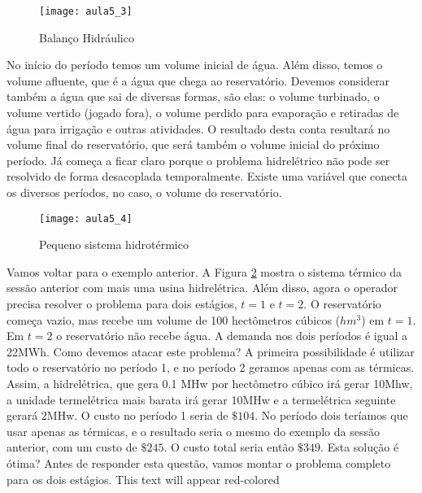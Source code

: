 \begin{figure}[H]
\begin{centering}
\texttt{[image: aula5\_3]}\protect\caption{\label{fig:balhid} Balanço Hidráulico}
\end{centering}
\end{figure}

No início do período temos um volume inicial de água. Além disso, temos o volume afluente, que é a água que chega ao reservatório. Devemos considerar também a água que sai de diversas formas, são elas: o volume turbinado, o volume vertido (jogado fora), o volume perdido para evaporação e retiradas de água para irrigação e outras atividades. O resultado desta conta resultará no volume final do reservatório, que será também o volume inicial do próximo período. Já começa a ficar claro porque o problema hidrelétrico não pode ser resolvido de forma desacoplada temporalmente. Existe uma variável que conecta os diversos períodos, no caso, o volume do reservatório. 

\begin{figure}[H]
\begin{centering}
\texttt{[image: aula5\_4]}\protect\caption{\label{fig:hdrotermico1}Pequeno sistema hidrotérmico}
\end{centering}
\end{figure}

Vamos voltar para o exemplo anterior. A Figura \ref{fig:hdrotermico1} mostra o sistema térmico da sessão anterior com mais uma usina hidrelétrica. Além disso, agora o operador precisa resolver o problema para dois estágios, $t=1$ e $t=2$. O reservatório começa vazio, mas recebe um volume de 100 hectômetros cúbicos ($hm^3$) em $t=1$. Em $t=2$ o reservatório não recebe água. A demanda nos dois períodos é igual a 22MWh. Como devemos atacar este problema? A primeira possibilidade é utilizar todo o reservatório no período 1, e no período 2 geramos apenas com as térmicas. Assim, a hidrelétrica, que gera 0.1 MHw por hectômetro cúbico irá gerar 10Mhw, a unidade termelétrica mais barata irá gerar 10MHw e a termelétrica seguinte gerará 2MHw. O custo no período 1 seria de $\$104$. No período dois teríamos que usar apenas as térmicas, e o resultado seria o mesmo do exemplo da sessão anterior, com um custo de $\$245$. O custo total seria então $\$349$. Esta solução é ótima? Antes de responder esta questão, vamos montar o problema completo para os dois estágios. {\color[rgb]{1,0,0} This text will appear red-colored} 

